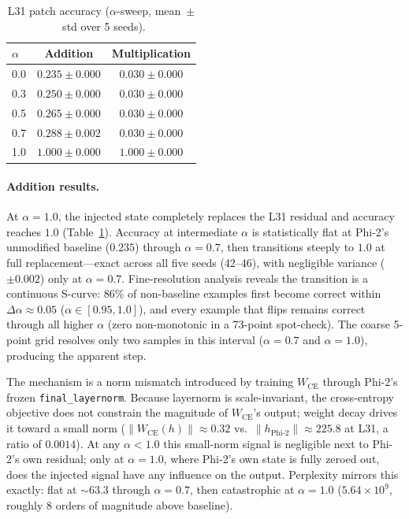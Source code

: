 \documentclass{article}
\begin{document}
\begin{table}[ht]
  \centering
  \caption{L31 patch accuracy ($\alpha$-sweep, mean~$\pm$~std over 5 seeds).}
  \label{tab:alpha_sweep}
  \begin{tabular}{lcc}
    \toprule
    $\alpha$ & Addition & Multiplication \\
    \midrule
    0.0 & $0.235 \pm 0.000$ & $0.030 \pm 0.000$ \\
    0.3 & $0.250 \pm 0.000$ & $0.030 \pm 0.000$ \\
    0.5 & $0.265 \pm 0.000$ & $0.030 \pm 0.000$ \\
    0.7 & $0.288 \pm 0.002$ & $0.030 \pm 0.000$ \\
    1.0 & $1.000 \pm 0.000$ & $1.000 \pm 0.000$ \\
    \bottomrule
  \end{tabular}
\end{table}

\paragraph{Addition results.}
At $\alpha = 1.0$, the injected state completely replaces the L31 residual and
accuracy reaches $1.0$ (Table~\ref{tab:alpha_sweep}).  Accuracy at
intermediate $\alpha$ is statistically flat at Phi-2's unmodified baseline
($0.235$) through $\alpha = 0.7$, then transitions steeply to $1.0$ at full
replacement---exact across all five seeds (42--46), with negligible
variance ($\pm 0.002$) only at $\alpha = 0.7$.  Fine-resolution analysis
reveals the transition is a continuous S-curve: 86\% of non-baseline
examples first become correct within $\Delta\alpha \approx 0.05$
($\alpha\in[0.95, 1.0]$), and every example that flips remains correct
through all higher $\alpha$ (zero non-monotonic in a 73-point
spot-check).  The coarse 5-point grid resolves only two samples in this
interval ($\alpha=0.7$ and $\alpha=1.0$), producing the apparent step.

The mechanism is a norm mismatch introduced by training $W_{\text{CE}}$
through Phi-2's frozen \texttt{final\_layernorm}.  Because layernorm is
scale-invariant, the cross-entropy objective does not constrain the magnitude
of $W_{\text{CE}}$'s output; weight decay drives it toward a small norm
 ($\|W_{\text{CE}}(h)\| \approx 0.32$ vs.\ $\|h_{\text{Phi-2}}\| \approx 225.8$
at L31, a ratio of $0.0014$).  At any $\alpha < 1.0$ this small-norm signal is
negligible next to Phi-2's own residual; only at $\alpha = 1.0$, where
Phi-2's own state is fully zeroed out, does the injected signal have any
influence on the output.  Perplexity mirrors this exactly: flat at $\sim 63.3$
through $\alpha = 0.7$, then catastrophic at $\alpha = 1.0$ ($5.64 \times
10^{9}$, roughly $8$ orders of magnitude above baseline).
\end{document}
